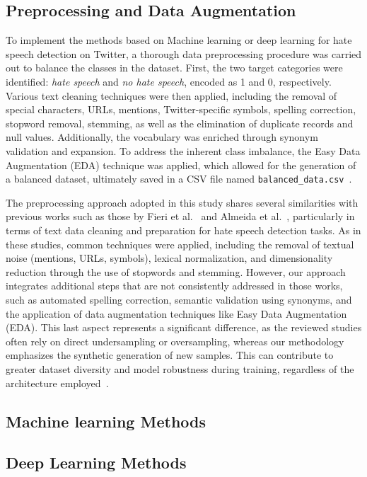 \subsection{Preprocessing and Data Augmentation}

To implement the methods based on Machine learning or deep learning for hate speech detection on Twitter, a thorough data preprocessing procedure was carried out to balance the classes in the dataset. First, the two target categories were identified: \textit{hate speech} and \textit{no hate speech}, encoded as 1 and 0, respectively. Various text cleaning techniques were then applied, including the removal of special characters, URLs, mentions, Twitter-specific symbols, spelling correction, stopword removal, stemming, as well as the elimination of duplicate records and null values. Additionally, the vocabulary was enriched through synonym validation and expansion. To address the inherent class imbalance, the Easy Data Augmentation (EDA) technique was applied, which allowed for the generation of a balanced dataset, ultimately saved in a CSV file named \texttt{balanced\_data.csv}~\cite{wei2019eda}.

The preprocessing approach adopted in this study shares several similarities with previous works such as those by Fieri et al.~\cite{fieri2023offensive} and Almeida et al.~\cite{almeida2023comparison}, particularly in terms of text data cleaning and preparation for hate speech detection tasks. As in these studies, common techniques were applied, including the removal of textual noise (mentions, URLs, symbols), lexical normalization, and dimensionality reduction through the use of stopwords and stemming. However, our approach integrates additional steps that are not consistently addressed in those works, such as automated spelling correction, semantic validation using synonyms, and the application of data augmentation techniques like Easy Data Augmentation (EDA). This last aspect represents a significant difference, as the reviewed studies often rely on direct undersampling or oversampling, whereas our methodology emphasizes the synthetic generation of new samples. This can contribute to greater dataset diversity and model robustness during training, regardless of the architecture employed~\cite{wei2019eda}.


\subsection{Machine learning Methods}






\subsection{Deep Learning Methods}





